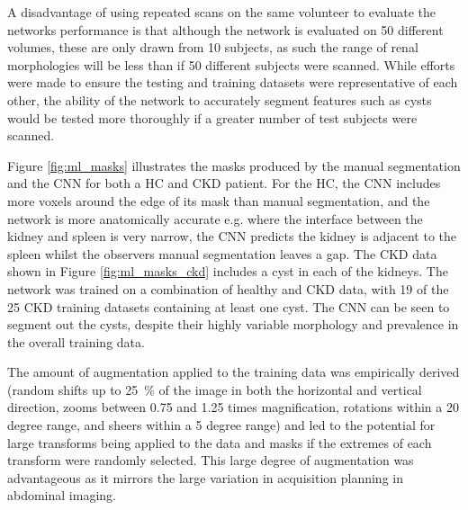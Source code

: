 A disadvantage of using repeated scans on the same volunteer to evaluate the networks performance is that although the network is evaluated on 50 different volumes, these are only drawn from 10 subjects, as such the range of renal morphologies will be less than if 50 different subjects were scanned. While efforts were made to ensure the testing and training datasets were representative of each other, the ability of the network to accurately segment features such as cysts would be tested more thoroughly if a greater number of test subjects were scanned. 

Figure \ref{fig:ml_masks} illustrates the masks produced by the manual segmentation and the \ac{CNN} for both a \ac{HC} and \ac{CKD} patient. For the \ac{HC}, the \ac{CNN} includes more voxels around the edge of its mask than manual segmentation, and the network is more anatomically accurate e.g. where the interface between the kidney and spleen is very narrow, the \ac{CNN} predicts the kidney is adjacent to the spleen whilst the observers manual segmentation leaves a gap. The \ac{CKD} data shown in Figure \ref{fig:ml_masks_ckd} includes a cyst in each of the kidneys. The network was trained on a combination of healthy and \ac{CKD} data, with 19 of the 25 \ac{CKD} training datasets containing at least one cyst. The \ac{CNN} can be seen to segment out the cysts, despite their highly variable morphology and prevalence in the overall training data.
 
The amount of augmentation applied to the training data was empirically derived (random shifts up to 25~\% of the image in both the horizontal and vertical direction, zooms between 0.75 and 1.25 times magnification, rotations within a 20 degree range, and sheers within a 5 degree range) and led to the potential for large transforms being applied to the data and masks if the extremes of each transform were randomly selected. This large degree of augmentation was advantageous as it mirrors the large variation in acquisition planning in abdominal imaging. 

